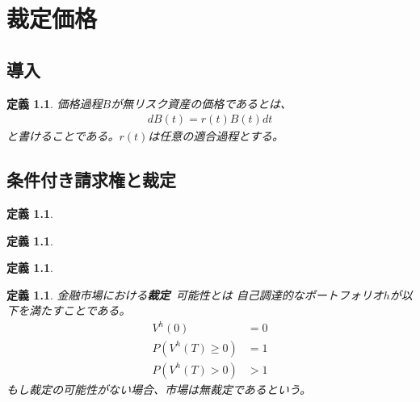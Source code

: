 \documentclass{jsbook}
\theoremstyle{withoutdotendstyle}
\newtheorem{definition}[theorem]{定義}
\numberwithin{theorem}{chapter}%
\begin{document}
\setcounter{chapter}{6}

\chapter{裁定価格}
\section{導入}
\begin{definition}
  価格過程$B$が無リスク資産の価格であるとは、
  \begin{align}
    dB\left(t\right)=r\left(t\right)B\left(t\right)dt
  \end{align}
  と書けることである。$r\left(t\right)$は任意の適合過程とする。
\end{definition}
\section{条件付き請求権と裁定}
\begin{definition}

\end{definition}
\begin{definition}

\end{definition}
\begin{definition}

\end{definition}
\begin{definition}
金融市場における{\bf 裁定} 可能性とは 自己調達的なポートフォリオ$h$が以下を満たすことである。
\begin{align}
  V^{h}\left(0\right)&=0\\
  P\left(V^{h}\left(T\right)\geq 0\right)&=1\\
  P\left(V^{h}\left(T\right)> 0\right)&>1
\end{align}
もし裁定の可能性がない場合、市場は無裁定であるという。
\end{definition}
\end{document}
